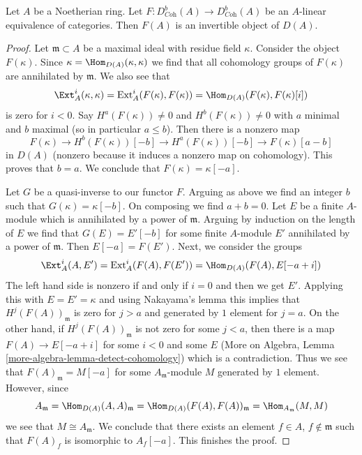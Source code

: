 \begin{lemma}
\label{lemma-equivalence-comes-from-invertible}
Let $A$ be a Noetherian ring. Let
$F : D^b_{\textit{Coh}}(A) \to D^b_{\textit{Coh}}(A)$ be an $A$-linear
equivalence of categories. Then $F(A)$ is an invertible object of $D(A)$.
\end{lemma}

\begin{proof}
Let $\mathfrak m \subset A$ be a maximal ideal with residue field $\kappa$.
Consider the object $F(\kappa)$. Since
$\kappa = \Hom_{D(A)}(\kappa, \kappa)$ we find that all
cohomology groups of $F(\kappa)$ are annihilated by $\mathfrak m$.
We also see that
$$
\Ext^i_A(\kappa, \kappa) = \text{Ext}^i_A(F(\kappa), F(\kappa))
= \Hom_{D(A)}(F(\kappa), F(\kappa)[i])
$$
is zero for $i < 0$. Say $H^a(F(\kappa)) \not = 0$ and
$H^b(F(\kappa)) \not = 0$ with $a$ minimal and $b$ maximal
(so in particular $a \leq b$). Then there is a nonzero map
$$
F(\kappa) \to H^b(F(\kappa))[-b] \to H^a(F(\kappa))[-b]
\to F(\kappa)[a - b]
$$
in $D(A)$ (nonzero because it induces a nonzero map on cohomology).
This proves that $b = a$. We conclude that $F(\kappa) = \kappa[-a]$.

\medskip\noindent
Let $G$ be a quasi-inverse to our functor $F$. Arguing as above
we find an integer $b$ such that $G(\kappa) = \kappa[-b]$.
On composing we find $a + b = 0$. Let $E$ be a finite $A$-module
which is annihilated by a power of $\mathfrak m$. Arguing by
induction on the length of $E$ we find that $G(E) = E'[-b]$
for some finite $A$-module $E'$ annihilated by a power of
$\mathfrak m$. Then $E[-a] = F(E')$.
Next, we consider the groups
$$
\Ext^i_A(A, E') = \text{Ext}^i_A(F(A), F(E')) =
\Hom_{D(A)}(F(A), E[-a + i])
$$
The left hand side is nonzero if and only if $i = 0$ and then
we get $E'$. Applying this with $E = E' = \kappa$ and using Nakayama's
lemma this implies that $H^j(F(A))_\mathfrak m$ is zero for $j > a$ and
generated by $1$ element for $j = a$. On the other hand, if
$H^j(F(A))_\mathfrak m$ is not zero for some $j < a$, then
there is a map $F(A) \to E[-a + i]$ for some $i < 0$ and some
$E$ (More on Algebra, Lemma \ref{more-algebra-lemma-detect-cohomology})
which is a contradiction.
Thus we see that $F(A)_\mathfrak m = M[-a]$
for some $A_\mathfrak m$-module $M$ generated by $1$ element.
However, since
$$
A_\mathfrak m = \Hom_{D(A)}(A, A)_\mathfrak m =
\Hom_{D(A)}(F(A), F(A))_\mathfrak m = \Hom_{A_\mathfrak m}(M, M)
$$
we see that $M \cong A_\mathfrak m$. We conclude that there exists
an element $f \in A$, $f \not \in \mathfrak m$ such that
$F(A)_f$ is isomorphic to $A_f[-a]$. This finishes the proof.
\end{proof}